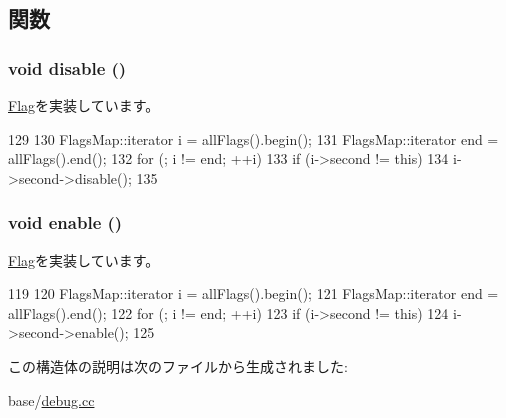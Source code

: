 \subsection{関数}
\hypertarget{structDebug_1_1AllFlags_a8cfbbe53c1cf6e3054736daea3044c0f}{
\subsubsection[{disable}]{\setlength{\rightskip}{0pt plus 5cm}void disable ()}}
\label{structDebug_1_1AllFlags_a8cfbbe53c1cf6e3054736daea3044c0f}


\hyperlink{classDebug_1_1Flag_ac79a817a699d8fb54e52bf6895db1b0d}{Flag}を実装しています。


\begin{DoxyCode}
129     {
130         FlagsMap::iterator i = allFlags().begin();
131         FlagsMap::iterator end = allFlags().end();
132         for (; i != end; ++i)
133             if (i->second != this)
134                 i->second->disable();
135     }
\end{DoxyCode}
\hypertarget{structDebug_1_1AllFlags_a486f22824bd83c5308a0d70ffac6f758}{
\subsubsection[{enable}]{\setlength{\rightskip}{0pt plus 5cm}void enable ()}}
\label{structDebug_1_1AllFlags_a486f22824bd83c5308a0d70ffac6f758}


\hyperlink{classDebug_1_1Flag_ad1c349e10e4417179f5eb3cb519670b5}{Flag}を実装しています。


\begin{DoxyCode}
119     {
120         FlagsMap::iterator i = allFlags().begin();
121         FlagsMap::iterator end = allFlags().end();
122         for (; i != end; ++i)
123             if (i->second != this)
124                 i->second->enable();
125     }
\end{DoxyCode}


この構造体の説明は次のファイルから生成されました:\begin{DoxyCompactItemize}
\item 
base/\hyperlink{base_2debug_8cc}{debug.cc}\end{DoxyCompactItemize}
